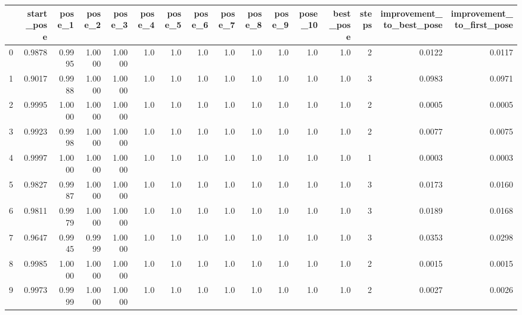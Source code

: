 \begin{tabular}{lrrrrrrrrrrrrrrr}
\toprule
{} &  start\_pose &  pose\_1 &  pose\_2 &  pose\_3 &  pose\_4 &  pose\_5 &  pose\_6 &  pose\_7 &  pose\_8 &  pose\_9 &  pose\_10 &  best\_pose &  steps &  improvement\_to\_best\_pose &  improvement\_to\_first\_pose \\
\midrule
0   &      0.9878 &  0.9995 &  1.0000 &  1.0000 &     1.0 &     1.0 &     1.0 &     1.0 &     1.0 &     1.0 &      1.0 &        1.0 &      2 &                    0.0122 &                     0.0117 \\
1   &      0.9017 &  0.9988 &  1.0000 &  1.0000 &     1.0 &     1.0 &     1.0 &     1.0 &     1.0 &     1.0 &      1.0 &        1.0 &      3 &                    0.0983 &                     0.0971 \\
2   &      0.9995 &  1.0000 &  1.0000 &  1.0000 &     1.0 &     1.0 &     1.0 &     1.0 &     1.0 &     1.0 &      1.0 &        1.0 &      2 &                    0.0005 &                     0.0005 \\
3   &      0.9923 &  0.9998 &  1.0000 &  1.0000 &     1.0 &     1.0 &     1.0 &     1.0 &     1.0 &     1.0 &      1.0 &        1.0 &      2 &                    0.0077 &                     0.0075 \\
4   &      0.9997 &  1.0000 &  1.0000 &  1.0000 &     1.0 &     1.0 &     1.0 &     1.0 &     1.0 &     1.0 &      1.0 &        1.0 &      1 &                    0.0003 &                     0.0003 \\
5   &      0.9827 &  0.9987 &  1.0000 &  1.0000 &     1.0 &     1.0 &     1.0 &     1.0 &     1.0 &     1.0 &      1.0 &        1.0 &      3 &                    0.0173 &                     0.0160 \\
6   &      0.9811 &  0.9979 &  1.0000 &  1.0000 &     1.0 &     1.0 &     1.0 &     1.0 &     1.0 &     1.0 &      1.0 &        1.0 &      3 &                    0.0189 &                     0.0168 \\
7   &      0.9647 &  0.9945 &  0.9999 &  1.0000 &     1.0 &     1.0 &     1.0 &     1.0 &     1.0 &     1.0 &      1.0 &        1.0 &      3 &                    0.0353 &                     0.0298 \\
8   &      0.9985 &  1.0000 &  1.0000 &  1.0000 &     1.0 &     1.0 &     1.0 &     1.0 &     1.0 &     1.0 &      1.0 &        1.0 &      2 &                    0.0015 &                     0.0015 \\
9   &      0.9973 &  0.9999 &  1.0000 &  1.0000 &     1.0 &     1.0 &     1.0 &     1.0 &     1.0 &     1.0 &      1.0 &        1.0 &      2 &                    0.0027 &                     0.0026 \\

\end{tabular}
